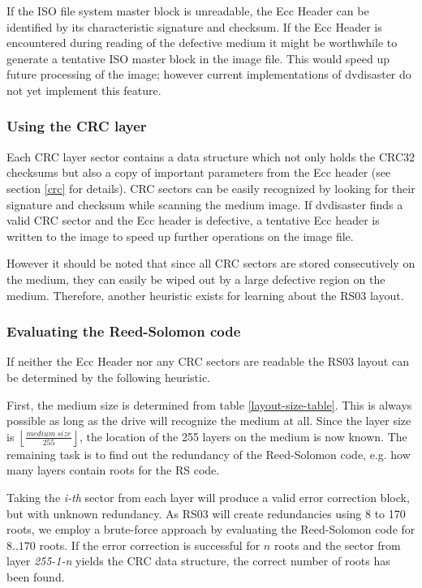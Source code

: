 If the ISO file system master block is unreadable, the Ecc Header
can be identified by its characteristic signature and checksum. 
If the Ecc Header is encountered during reading of the defective medium 
it might be worthwhile to generate a tentative ISO master block in the image
file. This would speed up future processing of the image; however current
implementations of dvdisaster do not yet implement this feature.

\subsubsection{Using the CRC layer}

Each CRC layer sector contains a data structure which not only holds the
CRC32 checksums but also a copy of important parameters from the Ecc header
(see section \ref{crc} for details). CRC sectors can be easily recognized
by looking for their signature and checksum while scanning the medium image.
If dvdisaster finds a valid CRC sector and the Ecc header is defective,
a tentative Ecc header is written to the image to speed up further
operations on the image file.

However it should be noted that since all CRC sectors are stored 
consecutively on the medium, they can easily be wiped out by a large
defective region on the medium. Therefore, another heuristic exists
for learning about the RS03 layout.

\subsubsection{Evaluating the Reed-Solomon code}
\label{recover-rs}

If neither the Ecc Header nor any CRC sectors are readable
the RS03 layout can be determined by the following heuristic.

First, the medium size is determined from table \ref{layout-size-table}.
This is always possible as long as the drive will recognize the medium at all.
Since the layer size is $\left\lfloor\frac{medium\ size}{255}\right\rfloor$,
the location of the 255 layers on the medium is now known. The remaining task is to find
out the redundancy of the Reed-Solomon code, e.g. how many layers contain
roots for the RS code.

\bigskip

Taking the {\em i-th} sector from each layer will produce a valid error 
correction block, but with unknown redundancy. As RS03 will create redundancies 
using 8 to 170 roots, we employ a brute-force approach by evaluating
the Reed-Solomon code for $8..170$ roots. If the error correction
is successful for $n$ roots and the sector from layer {\em 255-1-n} yields
the CRC data structure, the correct number of roots has been found.

